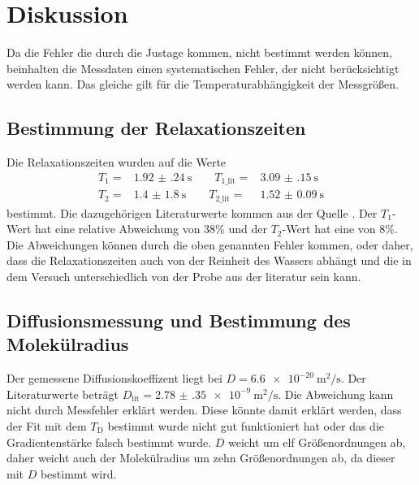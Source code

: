 \section{Diskussion}
\label{sec:Diskussion}
Da die Fehler die durch die Justage kommen, nicht bestimmt werden können, beinhalten die Messdaten 
einen systematischen Fehler, der nicht berücksichtigt werden kann. Das gleiche gilt für die Temperaturabhängigkeit 
der Messgrößen.
\subsection{Bestimmung der Relaxationszeiten}
Die Relaxationszeiten wurden auf die Werte 
\begin{align}
    T_{\text{1}}=& \SI{1.92(24)}{\second} \qquad T_{\text{1\_lit}}=& \SI{3.09(15)}{\second}\\
    T_{\text{2}}=& \SI{1.4(18)}{\second} \qquad T_{\text{2\_lit}}=& \SI{1.52(9)}{\second}
\end{align}
bestimmt.
Die dazugehörigen Literaturwerte kommen aus der Quelle \cite{Quelle_8}. Der $T_{\text{1}}$-Wert hat eine relative Abweichung 
von 38\% und der $T_{\text{2}}$-Wert hat eine von 8\%. Die Abweichungen können durch die oben genannten Fehler kommen, oder 
daher, dass die Relaxationszeiten auch von der Reinheit des Wassers abhängt und die in dem Versuch unterschiedlich von der 
Probe aus der literatur sein kann.
\subsection{Diffusionsmessung und Bestimmung des Molekülradius}
Der gemessene Diffusionskoeffizent liegt bei $D=\SI{6.6e-20}{\square\meter\per\second}$. Der Literaturwerte beträgt 
$D_{\text{lit}}= \SI{2.78(35)e-9}{\square\meter\per\second}$. Die Abweichung kann nicht durch Messfehler erklärt werden.
Diese könnte damit erklärt werden, dass der Fit mit dem $T_{\text{D}}$ bestimmt wurde nicht gut funktioniert hat oder 
das die Gradientenstärke falsch bestimmt wurde.
$D$ weicht um elf Größenordnungen ab, daher weicht auch der Molekülradius um zehn Größenordnungen ab, da dieser 
mit $D$ bestimmt wird.